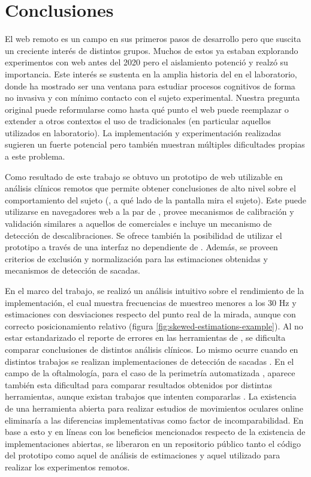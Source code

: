 \chapter{Conclusiones}

El \eyetracking web remoto es un campo en sus primeros pasos de desarrollo pero
que suscita un creciente interés de distintos grupos.
Muchos de estos ya estaban explorando experimentos con \eyetracking web antes
del 2020 pero el aislamiento potenció y realzó su importancia.
Este interés se sustenta en la amplia historia del \eyetracking en el
laboratorio, donde ha mostrado ser una ventana para estudiar procesos
cognitivos de forma no invasiva y con mínimo contacto con el sujeto
experimental.
Nuestra pregunta original puede reformularse como hasta qué punto el
\eyetracking web puede reemplazar o extender a otros contextos el uso de
\eyetrackers tradicionales (en particular aquellos utilizados en laboratorio).
La implementación y experimentación realizadas sugieren un fuerte potencial
pero también muestran múltiples dificultades propias a este problema.

Como resultado de este trabajo se obtuvo un prototipo de \eyetracker web
utilizable en análisis clínicos remotos que permite obtener conclusiones de
alto nivel sobre el comportamiento del sujeto (\eg, a qué lado de la pantalla
mira el sujeto).
Este puede utilizarse en navegadores web a la par de \jspsych, provee
mecanismos de calibración y validación similares a aquellos de \eyetrackers
comerciales e incluye un mecanismo de detección de descalibraciones.
Se ofrece también la posibilidad de utilizar el prototipo a través de una
interfaz no dependiente de \jspsych.
Además, se proveen criterios de exclusión y normalización para las estimaciones
obtenidas y mecanismos de detección de sacadas.

En el marco del trabajo, se realizó un análisis intuitivo sobre el rendimiento
de la implementación, el cual muestra frecuencias de muestreo menores a los 30
Hz y estimaciones con desviaciones respecto del punto real de la mirada, aunque
con correcto posicionamiento relativo (figura
\ref{fig:skewed-estimations-example}).
Al no estar estandarizado el reporte de errores en las herramientas de
\eyetracking \cite{zandi_2021_pupilext}, se dificulta comparar conclusiones de
distintos análisis clínicos.
Lo mismo ocurre cuando en distintos trabajos se realizan implementaciones
\adhoc de detección de sacadas \cite{salvucci_2000_identifying_fixations}.
En el campo de la oftalmología, para el caso de la perimetría automatizada
\cite{pubmed_1996_automated_perimetry}, aparece también esta dificultad para
comparar resultados obtenidos por distintas herramientas, aunque existan
trabajos que intenten compararlas
\cite{landers_2007_automated_perimeters_comparison}.
La existencia de una herramienta abierta para realizar estudios de movimientos
oculares online eliminaría a las diferencias implementativas como factor de
incomparabilidad.
En base a esto y en líneas con los beneficios mencionados respecto de la
existencia de implementaciones abiertas, se liberaron en un repositorio público
tanto el código del prototipo como aquel de análisis de estimaciones y aquel
utilizado para realizar los experimentos remotos.

